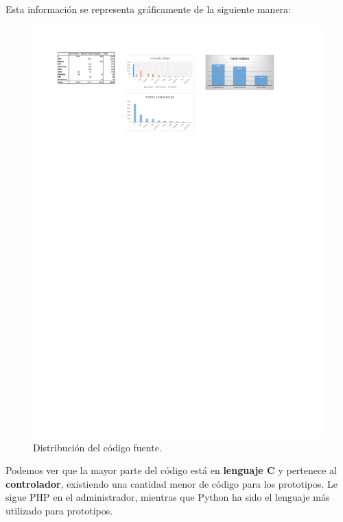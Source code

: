 \smallskip

Esta información se representa gráficamente de la siguiente manera:

\smallskip

\begin{figure}[H]
	\noindent \begin{centering}
		\includegraphics[width=\linewidth*3/4]{capitulo5/lineas}
		\par\end{centering}
	\smallskip
	\caption{\label{fig:lineas} Distribución del código fuente.}
\end{figure} 

\smallskip

Podemos ver que la mayor parte del código está en \textbf{lenguaje C} y pertenece al \textbf{controlador}, existiendo una cantidad menor de código para los prototipos. Le sigue \acrshort{PHP} en el administrador, mientras que Python ha sido el lenguaje más utilizado para prototipos.

